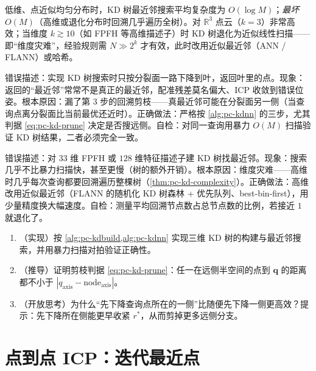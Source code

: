 \begin{theorem}[KD 树搜索复杂度]\label{thm:pc-kd-complexity}
低维、点近似均匀分布时，KD 树最近邻搜索平均复杂度为 $O(\log M)$；\emph{最坏} $O(M)$（高维或退化分布时回溯几乎遍历全树）。对 $\mathbb{R}^3$ 点云（$k=3$）非常高效；当维度 $k\gtrsim10$（如 FPFH 等高维描述子）时 KD 树退化为近似线性扫描——即“维度灾难”，经验规则需 $N\gg2^k$ 才有效，此时改用近似最近邻（ANN / FLANN）或哈希。
\end{theorem}

\begin{pitfall}
错误描述：实现 KD 树搜索时只按分裂面一路下降到叶，返回叶里的点。现象：返回的“最近邻”常常不是真正的最近邻，配准残差莫名偏大、ICP 收敛到错误位姿。根本原因：漏了第 3 步的回溯剪枝——真最近邻可能在分裂面另一侧（当查询点离分裂面比当前最优还近时）。正确做法：严格按 \cref{alg:pc-kdnn} 的三步，尤其判据 \cref{eq:pc-kd-prune} 决定是否搜远侧。自检：对同一查询用暴力 $O(M)$ 扫描验证 KD 树结果，二者必须完全一致。
\end{pitfall}

\begin{pitfall}
错误描述：对 $33$ 维 FPFH 或 $128$ 维特征描述子建 KD 树找最近邻。现象：搜索几乎不比暴力扫描快，甚至更慢（树的额外开销）。根本原因：维度灾难——高维时几乎每次查询都要回溯遍历整棵树（\cref{thm:pc-kd-complexity}）。正确做法：高维改用近似最近邻（FLANN 的随机化 KD 树森林 + 优先队列、best-bin-first），用少量精度换大幅速度。自检：测量平均回溯节点数占总节点数的比例，若接近 $1$ 就退化了。
\end{pitfall}

\begin{practice}
\begin{enumerate}
  \item （实现）按 \cref{alg:pc-kdbuild,alg:pc-kdnn} 实现三维 KD 树的构建与最近邻搜索，并用暴力扫描对拍验证正确性。
  \item （推导）证明剪枝判据 \cref{eq:pc-kd-prune}：任一在远侧半空间的点到 $\mathbf{q}$ 的距离都不小于 $|q_{\text{axis}}-\text{node}_{\text{axis}}|$。
  \item （开放思考）为什么“先下降查询点所在的一侧”比随便先下降一侧更高效？提示：先下降所在侧能更早收紧 $r^\ast$，从而剪掉更多远侧分支。
\end{enumerate}
\end{practice}

\section{点到点 ICP：迭代最近点}
\label{sec:pc-icp}

